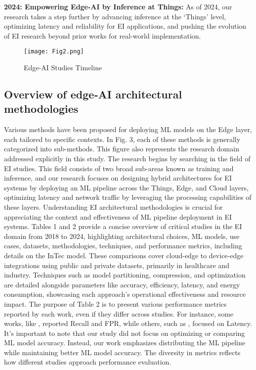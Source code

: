	\textbf{2024: Empowering Edge-AI by Inference at Things:} As of 2024, our research takes a
	step further by advancing inference at the ‘Things’ level, optimizing latency and
	reliability for EI applications, and pushing the evolution of EI research beyond
	prior works for real-world implementation.
	
	\begin{figure}[t]
		\centering
		\texttt{[image: Fig2.png]}
		\caption{Edge-AI Studies Timeline}
	\end{figure}
	
	\subsection{ Overview of edge‑AI architectural methodologies}
	Various methods have been proposed for deploying ML models on the Edge layer, each
	tailored to specific contexts. In Fig. 3, each of these methods is generally categorized
	into sub-methods. This figure also represents the research domain addressed explicitly
	in this study. The research begins by searching in the field of EI studies. This field consists of two broad sub-areas known as training and inference, and our research focuses
	on designing hybrid architectures for EI systems by deploying an ML pipeline across
	the Things, Edge, and Cloud layers, optimizing latency and network traffic by leveraging the processing capabilities of these layers. Understanding EI architectural methodologies is crucial for appreciating the context and effectiveness of ML pipeline deployment in EI systems. Tables 1 and 2 provide a concise overview of critical studies in
	the EI domain from 2018 to 2024, highlighting architectural choices, ML models, use
	cases, datasets, methodologies, techniques, and performance metrics, including details
	on the InTec model. These comparisons cover cloud-edge to device-edge integrations
	using public and private datasets, primarily in healthcare and industry. Techniques such
	as model partitioning, compression, and optimization are detailed alongside parameters like accuracy, efficiency, latency, and energy consumption, showcasing each approach’s
	operational effectiveness and resource impact. The purpose of Table 2 is to present various performance metrics reported by each work, even if they differ across studies. For
	instance, some works, like \cite{c23}, reported Recall and FPR, while others, such as \cite{c27}, focused on Latency. It’s important to note that our study did not focus on optimizing
	or comparing ML model accuracy. Instead, our work emphasizes distributing the ML
	pipeline while maintaining better ML model accuracy. The diversity in metrics reflects
	how different studies approach performance evaluation.
	
